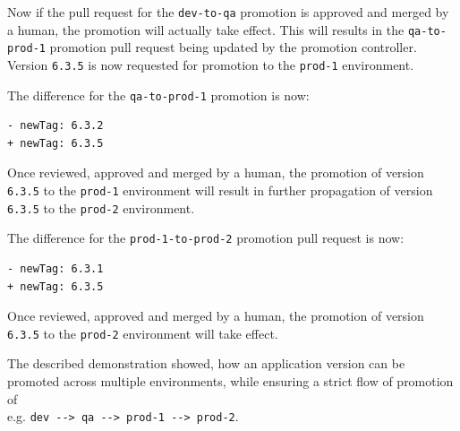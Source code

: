 
Now if the pull request for the \lstinline|dev-to-qa| promotion
is approved and merged by a human,
the promotion will actually take effect.
This will results in the \lstinline|qa-to-prod-1| promotion pull request being updated
by the promotion controller.
Version \lstinline|6.3.5| is now requested for promotion to the
\lstinline|prod-1| environment.

The difference for the \lstinline|qa-to-prod-1| promotion is now:

\begin{lstlisting}
- newTag: 6.3.2
+ newTag: 6.3.5
\end{lstlisting}

Once reviewed, approved and merged by a human,
the promotion of version \lstinline|6.3.5| to the \lstinline|prod-1| environment
will result in further propagation of version \lstinline|6.3.5|
to the \lstinline|prod-2| environment.

The difference for the \lstinline|prod-1-to-prod-2| promotion pull request is now:

\begin{lstlisting}
- newTag: 6.3.1
+ newTag: 6.3.5
\end{lstlisting}

Once reviewed, approved and merged by a human,
the promotion of version \lstinline|6.3.5| to the \lstinline|prod-2| environment
will take effect.

The described demonstration showed,
how an application version can be promoted across multiple environments,
while ensuring a strict flow of promotion of \\
e.g. \lstinline|dev --> qa --> prod-1 --> prod-2|.



























